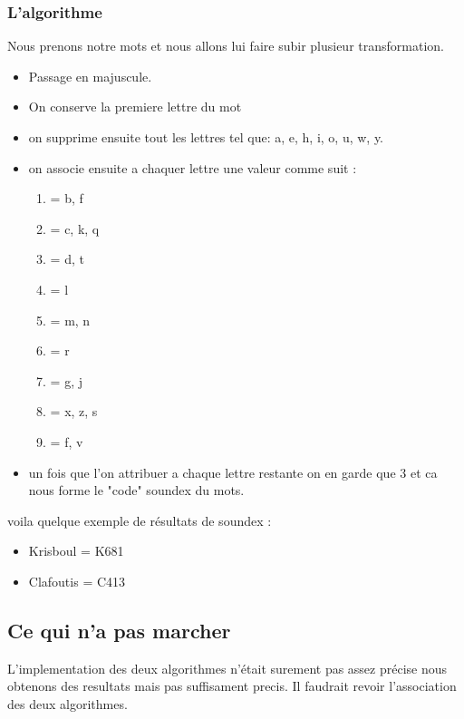\subsubsection{L'algorithme}
Nous prenons notre mots et nous allons lui faire subir plusieur transformation.
\begin{itemize}
	\item Passage en majuscule.
	\item On conserve la premiere lettre du mot 
	\item on supprime ensuite tout les lettres tel que: a, e, h, i, o, u, w, y.
	\item on associe ensuite a chaquer lettre une valeur comme suit :
		\begin{enumerate}
		\item = b, f
		\item = c, k, q
		\item = d, t
		\item = l
		\item = m, n
		\item = r
		\item = g, j
		\item = x, z, s
		\item = f, v
		\end{enumerate}
	      \item un fois que l'on attribuer a chaque lettre restante on en garde que 3 et ca nous forme le "code" soundex du mots.
\end{itemize}

voila quelque exemple de résultats de soundex : 
\begin{itemize}
  \item Krisboul = K681
  \item Clafoutis = C413
\end{itemize}
\subsection{Ce qui n'a pas marcher}
L'implementation des deux algorithmes n'était surement pas assez précise nous obtenons des resultats mais pas suffisament precis. Il faudrait revoir l'association des deux algorithmes.
